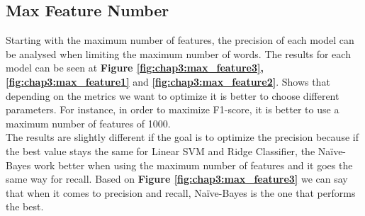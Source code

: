 \subsection{Max Feature Number}
Starting with the maximum number of features, the precision of each model can be analysed when limiting the maximum number of words. The results for each model can be seen at \textbf{Figure \ref{fig:chap3:max_feature3}, \ref{fig:chap3:max_feature1}} and \textbf{\ref{fig:chap3:max_feature2}}. Shows that depending on the metrics we want to optimize it is better to choose different parameters. For instance, in order to maximize F1-score, it is better to use a maximum number of features of 1000.\\

The results are slightly different if the goal is to optimize the precision because if the best value stays the same for Linear SVM and Ridge Classifier, the Na\"{i}ve-Bayes work better when using the maximum number of features and it goes the same way for recall. 
Based on \textbf{Figure \ref{fig:chap3:max_feature3}} we can say that when it comes to precision and recall, Na\"{i}ve-Bayes is the one that performs the best.\\

